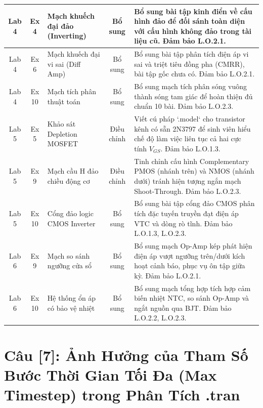 \documentclass[12pt,a4paper]{report}
\begin{document}
\begin{longtable}{|c|c|p{4.0cm}|c|p{5.5cm}|}
Lab 4 & Ex 4 & Mạch khuếch đại đảo (Inverting) & Bổ sung & Bổ sung bài tập kinh điển về cấu hình đảo để đối sánh toàn diện với cấu hình không đảo trong tài liệu cũ. Đảm bảo L.O.2.1. \\ \hline

Lab 4 & Ex 6 & Mạch khuếch đại vi sai (Diff Amp) & Bổ sung & Bổ sung bài tập phân tích điện áp vi sai và triệt tiêu đồng pha (CMRR), bài tập gốc chưa có. Đảm bảo L.O.2.1. \\ \hline

Lab 4 & Ex 10 & Mạch tích phân thuật toán & Bổ sung & Bổ sung mạch tích phân sóng vuông thành sóng tam giác để hoàn thiện đủ chuẩn 10 bài. Đảm bảo L.O.2.3. \\ \hline

Lab 5 & Ex 5 & Khảo sát Depletion MOSFET & Điều chỉnh & Viết cú pháp `.model` cho transistor kênh có sẵn 2N3797 để sinh viên hiểu chế độ làm việc liên tục cả hai cực tính $V_{GS}$. Đảm bảo L.O.1.3. \\ \hline

Lab 5 & Ex 9 & Mạch cầu H đảo chiều động cơ & Điều chỉnh & Tinh chỉnh cấu hình Complementary PMOS (nhánh trên) và NMOS (nhánh dưới) tránh hiện tượng ngắn mạch Shoot-Through. Đảm bảo L.O.2.3. \\ \hline

Lab 5 & Ex 10 & Cổng đảo logic CMOS Inverter & Bổ sung & Bổ sung bài tập cổng đảo CMOS phân tích đặc tuyến truyền đạt điện áp VTC và dòng rò tĩnh. Đảm bảo L.O.1.3, L.O.2.3. \\ \hline

Lab 6 & Ex 9 & Mạch so sánh ngưỡng cửa sổ & Bổ sung & Bổ sung mạch Op-Amp kép phát hiện điện áp vượt ngưỡng trên/dưới kích hoạt cảnh báo, phục vụ ôn tập giữa kỳ. Đảm bảo L.O.2.1. \\ \hline

Lab 6 & Ex 10 & Hệ thống ổn áp có bảo vệ nhiệt & Bổ sung & Bổ sung mạch tổng hợp tích hợp cảm biến nhiệt NTC, so sánh Op-Amp và ngắt nguồn qua BJT. Đảm bảo L.O.2.2, L.O.2.3. \\ \hline
\end{longtable}

\section*{Câu [7]: Ảnh Hưởng của Tham Số Bước Thời Gian Tối Đa (Max Timestep) trong Phân Tích .tran}
\end{document}
